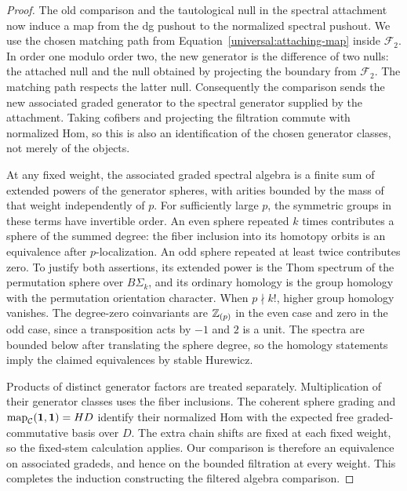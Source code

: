 \begin{proof}
The old comparison and the tautological null in the spectral
attachment now induce a map from the dg pushout to the
normalized spectral pushout. We use the chosen matching
path from Equation~\eqref{universal:attaching-map} inside
$\mathcal F_2$. In order one modulo order two, the new
generator is the difference of two nulls: the attached null
and the null obtained by projecting the boundary from
$\mathcal F_2$. The matching path respects the latter null.
Consequently the comparison sends the new associated graded
generator to the spectral generator supplied by the attachment.
Taking cofibers and projecting the filtration commute with
normalized Hom, so this is also an identification of the
chosen generator classes, not merely of the objects.

At any fixed weight, the associated graded spectral algebra
is a finite sum of extended powers of the generator spheres,
with arities bounded by the mass of that weight independently
of $p$. For sufficiently large $p$, the symmetric groups
in these terms have invertible order. An even sphere
repeated $k$ times contributes a sphere of the summed degree:
the fiber inclusion into its homotopy orbits is an equivalence
after $p$-localization. An odd sphere repeated at least twice
contributes zero. To justify both assertions, its extended
power is the Thom spectrum of the permutation sphere over
$B\Sigma_k$, and its ordinary homology is the group homology
with the permutation orientation character. When
$p\nmid k!$, higher group homology vanishes. The degree-zero
coinvariants are $\mathbb Z_{(p)}$ in the even case and zero in the
odd case, since a transposition acts by $-1$ and $2$ is a
unit. The spectra are bounded below after translating the
sphere degree, so the homology statements imply the claimed
equivalences by stable Hurewicz.

Products of distinct generator factors are treated separately.
Multiplication of their generator classes uses the fiber
inclusions. The coherent sphere grading and
$\operatorname{map}_{\mathcal C}(\mathbf 1,\mathbf 1)=HD$ identify their normalized Hom
with the expected free graded-commutative basis over $D$.
The extra chain shifts are fixed at each fixed weight, so
the fixed-stem calculation applies. Our comparison is
therefore an equivalence on associated gradeds, and hence
on the bounded filtration at every weight. This completes
the induction constructing the filtered algebra comparison.


\end{proof}
